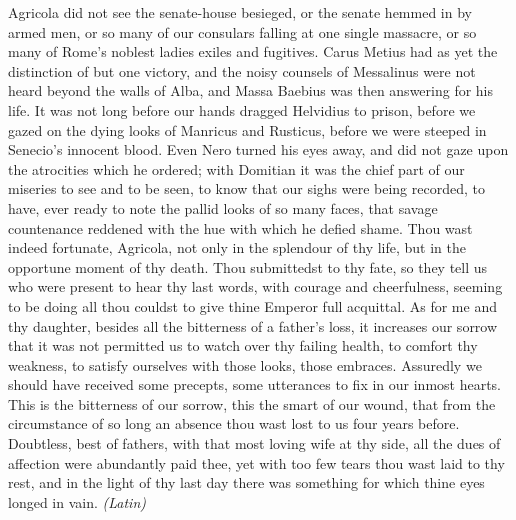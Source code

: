
Agricola did not see the senate-house besieged, or the senate hemmed in by armed men, or so many of our consulars falling at one single massacre, or so many of Rome's noblest ladies exiles and fugitives. Carus Metius had as yet the distinction of but one victory, and the noisy counsels of Messalinus were not heard beyond the walls of Alba, and Massa Baebius was then answering for his life. It was not long before our hands dragged Helvidius to prison, before we gazed on the dying looks of Manricus and Rusticus, before we were steeped in Senecio's innocent blood. Even Nero turned his eyes away, and did not gaze upon the atrocities which he ordered; with Domitian it was the chief part of our miseries to see and to be seen, to know that our sighs were being recorded, to have, ever ready to note the pallid looks of so many faces, that savage countenance reddened with the hue with which he defied shame. Thou wast indeed fortunate, Agricola, not only in the splendour of thy life, but in the opportune moment of thy death. Thou submittedst to thy fate, so they tell us who were present to hear thy last words, with courage and cheerfulness, seeming to be doing all thou couldst to give thine Emperor full acquittal. As for me and thy daughter, besides all the bitterness of a father's loss, it increases our sorrow that it was not permitted us to watch over thy failing health, to comfort thy weakness, to satisfy ourselves with those looks, those embraces. Assuredly we should have received some precepts, some utterances to fix in our inmost hearts. This is the bitterness of our sorrow, this the smart of our wound, that from the circumstance of so long an absence thou wast lost to us four years before. Doubtless, best of fathers, with that most loving wife at thy side, all the dues of affection were abundantly paid thee, yet with too few tears thou wast laid to thy rest, and in the light of thy last day there was something for which thine eyes longed in vain. \emph{(Latin)}


